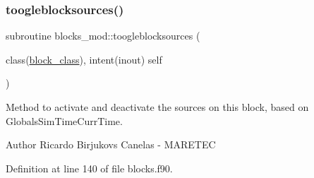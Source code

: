 \mbox{\label{namespaceblocks__mod_ab9e57cbf0103b632b2b2dfa4e4d4139c}} 
\subsubsection{\texorpdfstring{toogleblocksources()}{toogleblocksources()}}
{\footnotesize\ttfamily subroutine blocks\+\_\+mod\+::toogleblocksources (\begin{DoxyParamCaption}\item[{class(\mbox{\hyperlink{structblocks__mod_1_1block__class}{block\+\_\+class}}), intent(inout)}]{self }\end{DoxyParamCaption})\hspace{0.3cm}{\ttfamily [private]}}



Method to activate and deactivate the sources on this block, based on GlobalsSim\+TimeCurr\+Time. 

\begin{DoxyAuthor}{Author}
Ricardo Birjukovs Canelas -\/ M\+A\+R\+E\+T\+EC 
\end{DoxyAuthor}


Definition at line 140 of file blocks.\+f90.


